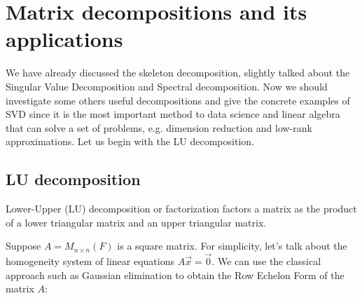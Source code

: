 \setcounter{section}{2}
\section{Matrix decompositions and its applications}
\par 
We have already discussed the skeleton decomposition, slightly talked about the Singular Value Decomposition and Spectral decomposition. Now we should investigate some others useful decompositions and give the concrete examples of SVD since it is the most important method to data science and linear algebra that can solve a set of problems, e.g. dimension reduction and low-rank approximations. Let us begin with the LU decomposition.

\subsection*{LU decomposition}
Lower-Upper (LU) decomposition or factorization factors a matrix as the product of a lower triangular matrix and an upper triangular matrix. 
\par
Suppose $A = M_{n \times n}(F)$ is a square matrix. For simplicity, let's talk about the homogeneity system of linear equations $A\vec{x} = \vec{0}$. We can use the classical approach such as Gaussian elimination to obtain the Row Echelon Form of the matrix $A$:

